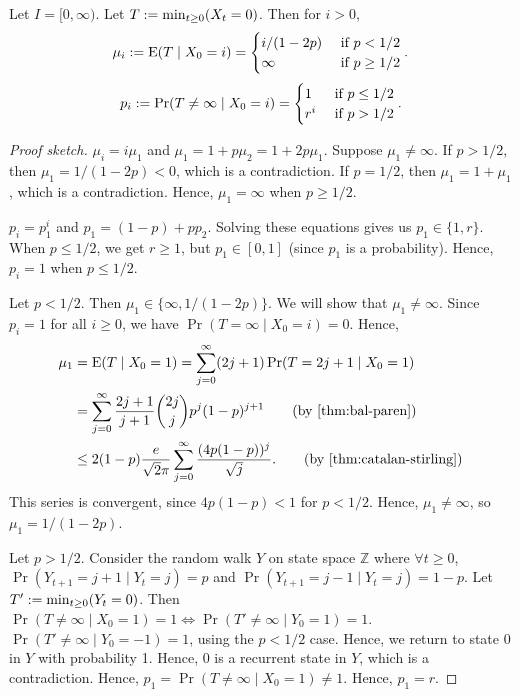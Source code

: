 \documentclass[a4paper, 12pt, fleqn]{article}
\begin{document}
\begin{lemma}
Let $I = [0, \infty)$. Let $T := \min_{t \ge 0} (X_t = 0)$. Then for $i > 0$,
\[ \mu_i := \operatorname*{E}(T \mid X_0 = i) = \begin{cases}
i/(1-2p) & \textrm{ if } p < 1/2
\\ \infty & \textrm{ if } p \ge 1/2
\end{cases}. \]
\[ p_i := \Pr(T \neq \infty \mid X_0 = i) = \begin{cases}
1 & \textrm{ if } p \le 1/2
\\ r^i & \textrm{ if } p > 1/2
\end{cases}. \]
\end{lemma}
\begin{proof}[Proof sketch]
$\mu_i = i\mu_1$ and $\mu_1 = 1 + p\mu_2 = 1 + 2p\mu_1$.
Suppose $\mu_1 \neq \infty$.
If $p > 1/2$, then $\mu_1 = 1/(1-2p) < 0$, which is a contradiction.
If $p = 1/2$, then $\mu_1 = 1 + \mu_1$, which is a contradiction.
Hence, $\mu_1 = \infty$ when $p \ge 1/2$.

$p_i = p_1^i$ and $p_1 = (1-p) + pp_2$.
Solving these equations gives us $p_1 \in \{1, r\}$.
When $p \le 1/2$, we get $r \ge 1$, but $p_1 \in [0, 1]$ (since $p_1$ is a probability).
Hence, $p_i = 1$ when $p \le 1/2$.

Let $p < 1/2$. Then $\mu_1 \in \{\infty, 1/(1-2p)\}$.
We will show that $\mu_1 \neq \infty$.
Since $p_i = 1$ for all $i \ge 0$, we have $\Pr(T = \infty \mid X_0 = i) = 0$. Hence,
\begin{align*}
\mu_1 &= \E(T \mid X_0=1) = \sum_{j=0}^{\infty} (2j+1)\Pr(T=2j+1 \mid X_0=1)
\\ &= \sum_{j=0}^{\infty} \frac{2j+1}{j+1} \binom{2j}{j}p^j(1-p)^{j+1}
    \tag{by \cref{thm:bal-paren}}
\\ &\le 2(1-p)\frac{e}{\sqrt{2}\pi} \sum_{j=0}^{\infty} \frac{(4p(1-p))^j}{\sqrt{j}}.
    \tag{by \cref{thm:catalan-stirling}}
\end{align*}
This series is convergent, since $4p(1-p) < 1$ for $p < 1/2$.
Hence, $\mu_1 \neq \infty$, so $\mu_1 = 1/(1-2p)$.

Let $p > 1/2$.
Consider the random walk $Y$ on state space $\mathbb{Z}$ where $\forall t \ge 0$,
$\Pr(Y_{t+1} = j+1 \mid Y_t = j) = p$ and $\Pr(Y_{t+1} = j-1 \mid Y_t=j) = 1-p$.
Let $T' := \min_{t \ge 0} (Y_t = 0)$.
Then $\Pr(T \neq \infty \mid X_0 = 1) = 1 \iff \Pr(T' \neq \infty \mid Y_0 = 1) = 1$.
$\Pr(T' \neq \infty \mid Y_0 = -1) = 1$, using the $p < 1/2$ case.
Hence, we return to state 0 in $Y$ with probability 1.
Hence, 0 is a recurrent state in $Y$, which is a contradiction.
Hence, $p_1 = \Pr(T \neq \infty \mid X_0 = 1) \neq 1$. Hence, $p_1 = r$.
\end{proof}
\end{document}
